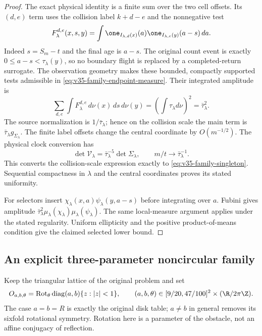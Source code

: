 \begin{proof}
The exact physical identity is a finite sum over the two cell offsets.
Its $(d,e)$ term uses the collision label $k+d-e$ and the nonnegative
test
\[
 F^{d,e}_\lambda(x,s,y)=
   \int\one_{I_{\lambda,d}(x)}(a)
             \one_{I_{\lambda,e}(y)}(a-s)\,da.
\]
Indeed $s=S_m-t$ and the final age is $a-s$. The original count event
is exactly $0\le a-s<\tau_\lambda(y)$, so no boundary flight is
replaced by a completed-return surrogate. The observation geometry
makes these bounded, compactly supported tests admissible in
\eqref{eq:v35-family-endpoint-measure}. Their integrated amplitude is
\[
 \sum_{d,e}\int F^{d,e}_\lambda\,d\nu(x)\,ds\,d\nu(y)
       =\left(\int\tau_\lambda d\nu\right)^2=\bar\tau_\lambda^2.
\]
The source normalization is $1/\bar\tau_\lambda$; hence on the collision
scale the main term is $\bar\tau_\lambda g_{\Sigma_\lambda}$.
The finite label offsets change the central coordinate by
$O(m^{-1/2})$. The physical clock conversion has
\[
 \det\mathcal V_\lambda=\bar\tau_\lambda^{-5}\det\Sigma_\lambda,
            \qquad m/t\longrightarrow\bar\tau_\lambda^{-1}.
\]
This converts the collision-scale expression exactly to
\eqref{eq:v35-family-singleton}. Sequential compactness in $\lambda$
and the central coordinates proves its stated uniformity.

For selectors insert $\chi_\lambda(x,a)\psi_\lambda(y,a-s)$ before
integrating over $a$. Fubini gives amplitude
$\bar\tau_\lambda^2\mu_\lambda(\chi_\lambda)
\mu_\lambda(\psi_\lambda)$. The same local-measure argument applies
under the stated regularity. Uniform ellipticity and the positive
product-of-means condition give the claimed selected lower bound.
\end{proof}

\subsection{An explicit three-parameter noncircular family}
Keep the triangular lattice of the original problem and set
\begin{equation}\label{eq:v35-ellipses}
 O_{a,b,\theta}=\operatorname{Rot}_\theta
       \operatorname{diag}(a,b)\{z:|z|<1\},\qquad
 (a,b,\theta)\in[9/20,47/100]^2\times(\R/2\pi\Z).
\end{equation}
The case $a=b=R$ is exactly the original disk table; $a\ne b$ in
general removes its sixfold rotational symmetry. Rotation here is a
parameter of the obstacle, not an affine conjugacy of reflection.

